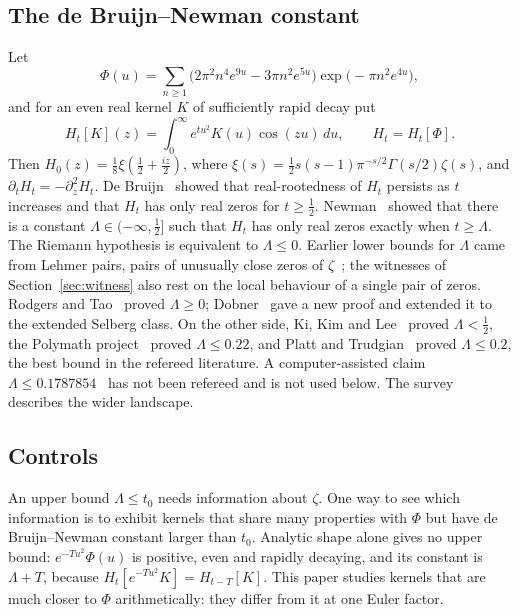 \documentclass[11pt]{article}
\numberwithin{equation}{section}
\theoremstyle{definition}
\theoremstyle{remark}
\newcommand{\dd}{\,d}
\begin{document}
\subsection{The de Bruijn--Newman constant}
Let
\begin{equation}\label{eq:Phi}
\Phi(u)=\sum_{n\ge1}\bigl(2\pi^2n^4e^{9u}-3\pi n^2e^{5u}\bigr)
\exp\bigl(-\pi n^2e^{4u}\bigr),
\end{equation}
and for an even real kernel $K$ of sufficiently rapid decay put
\begin{equation}\label{eq:Ht}
H_t[K](z)=\int_0^\infty e^{tu^2}K(u)\cos(zu)\dd u ,\qquad
H_t=H_t[\Phi].
\end{equation}
Then $H_0(z)=\tfrac18\xi(\tfrac12+\tfrac{iz}2)$, where
$\xi(s)=\tfrac12s(s-1)\pi^{-s/2}\Gamma(s/2)\zeta(s)$, and
$\partial_tH_t=-\partial_z^2H_t$. De Bruijn~\cite{debruijn} showed that
real-rootedness of $H_t$ persists as $t$ increases and that $H_t$ has only
real zeros for $t\ge\tfrac12$. Newman~\cite{newman} showed that there is a
constant $\Lambda\in(-\infty,\tfrac12]$ such that $H_t$ has only real zeros
exactly when $t\ge\Lambda$. The Riemann hypothesis
is equivalent to $\Lambda\le0$. Earlier lower bounds for $\Lambda$ came
from Lehmer pairs, pairs of unusually close zeros of
$\zeta$~\cite{csordassmithvarga}; the witnesses of Section~\ref{sec:witness}
also rest on the local behaviour of a single pair of zeros. Rodgers and
Tao~\cite{rodgerstao} proved $\Lambda\ge0$; Dobner~\cite{dobner} gave a new proof and extended it to the
extended Selberg class. On the other side, Ki, Kim and Lee~\cite{kikimlee}
proved $\Lambda<\tfrac12$, the Polymath project~\cite{polymath} proved
$\Lambda\le0.22$, and Platt and Trudgian~\cite{platttrudgian} proved
$\Lambda\le0.2$, the best bound in the refereed literature. A computer-assisted
claim $\Lambda\le0.1787854$~\cite{gomila} has not been refereed and is not
used below. The survey~\cite{newmanwu} describes the wider landscape.

\subsection{Controls}
An upper bound $\Lambda\le t_0$ needs information about $\zeta$. One way to
see which information is to exhibit kernels that share many properties
with $\Phi$ but have de Bruijn--Newman constant larger than $t_0$. Analytic
shape alone gives no upper bound: $e^{-Tu^2}\Phi(u)$ is positive, even and
rapidly decaying, and its constant is $\Lambda+T$, because
$H_t[e^{-Tu^2}K]=H_{t-T}[K]$. This paper studies kernels that are much closer to $\Phi$
arithmetically: they differ from it at one Euler factor.
\end{document}
